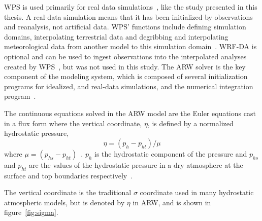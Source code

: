 WPS is used primarily for real data simulations~\citep{Wang2015}, like the study presented in this thesis. A real-data simulation means that it has been initialized by observations and reanalysis, not artificial data. WPS' functions include defining simulation domains, interpolating terrestrial data and degribbing and interpolating meteorological data from another model to this simulation domain~\citep{Wang2015}. WRF-DA is optional and can be used to ingest observations into the interpolated analyses created by WPS~\citep{Wang2015}, but was not used in this study. The ARW solver is the key component of the modeling system, which is composed of several initialization programs for idealized, and real-data simulations, and the numerical integration program~\citep{Wang2015}.%

The continuous equations solved in the ARW model are the Euler equations cast in a flux form where the vertical coordinate, $\eta$, is defined by a normalized hydrostatic pressure,
\begin{equation}
\eta = (p_h - p_{ht})/\mu 
\end{equation}
where $\mu = (p_{hs} - p_{ht})$~\citep{Skamarock2008}. $p_h$ is the hydrostatic component of the pressure and $p_{hs}$ and $p_{ht}$ are the values of the hydrostatic pressure in a dry atmosphere at the surface and top boundaries respectively~\citep{Skamarock2008}.

The vertical coordinate is the traditional $\sigma$ coordinate used in many hydrostatic atmospheric models, but is denoted by $\eta$ in ARW, and is shown in figure~\ref{fig:sigma}.

